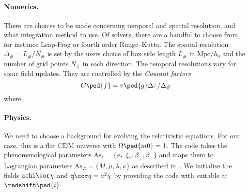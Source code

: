 \begin{draft}

\subsection{}

    
    \paragraph{Numerics.} %
    There are choices to be made concerning temporal and spatial resolution, and what integration method to use. Of solvers, there are a handful to choose from, for instance Leap-Frog or fourth order Runge--Kutta. The spatial resolution $\Delta_\#= L_\#/N_\#$ is set by the users choice of box side length $L_\# $ in $\text{Mpc}/h_0$ and the number of grid points $N_\#$ in each direction. The temporal resolution\emph{s} vary for some field updates. They are controlled by the \emph{Courant factors}
    \begin{equation}
        C\ped{f} = v\ped{g} \Delta \tau / \Delta_\#
    \end{equation}
    where \blahblah {}


    \paragraph{Physics.} %
    We need to choose a background for evolving the relativistic equations. For our case, this is a flat \textLambda{}CDM universe with $\Omega\ped{m0}=1$. %
    The code takes the phenomenological parameters $\mathrm{As}_\ast = \{a_\ast, \xi_\ast, \beta_+, \beta_- \}$ and maps them to Lagrangian parameters $\mathrm{As}_\mathcal{L} = \{ M, \mu, \lambda, \kappa \}$ as described in~. We initialise the fields $\mathtt{achi}\cor \chi$ and $\mathtt{q} \cor q=a^2 \dot{\chi}$ by providing the code with suitable \blahblah at $\redshift\ped{i}$.








\end{draft}
